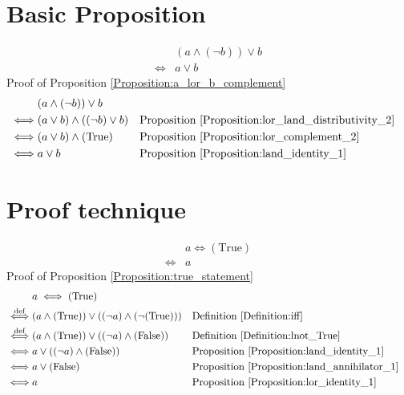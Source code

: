 \section{Basic Proposition}
\begin{prop}
\label{Proposition:a_lor_b_complement}
\begin{align*}
& (a \land (\lnot b)) \lor b \\
\iff & a \lor b
\end{align*}
Proof of Proposition \ref{Proposition:a_lor_b_complement}
\begin{align*}
& (a \land (\lnot b)) \lor b \\
\iff & (a \lor b) \land ((\lnot b) \lor b)
&& \text{Proposition \ref{Proposition:lor_land_distributivity_2}} \\
\iff & (a \lor b) \land (\text{True})
&& \text{Proposition \ref{Proposition:lor_complement_2}} \\
\iff & a \lor b
&& \text{Proposition \ref{Proposition:land_identity_1}} \\
\end{align*}
\end{prop}

\section{Proof technique}
\begin{prop}
\label{Proposition:true_statement}
\begin{align*}
& a \iff (\text{True}) \\
\iff & a
\end{align*}
Proof of Proposition \ref{Proposition:true_statement}
\begin{align*}
& a \iff (\text{True}) \\
\overset{\operatorname{def}}{\iff} & (a \land (\text{True})) \lor ((\lnot a) \land (\lnot (\text{True})))
&& \text{Definition \ref{Definition:iff}} \\
\overset{\operatorname{def}}{\iff} & (a \land (\text{True})) \lor ((\lnot a) \land (\text{False}))
&& \text{Definition \ref{Definition:lnot_True}} \\
\iff & a \lor ((\lnot a) \land (\text{False}))
&& \text{Proposition \ref{Proposition:land_identity_1}} \\
\iff & a \lor (\text{False})
&& \text{Proposition \ref{Proposition:land_annihilator_1}} \\
\iff & a
&& \text{Proposition \ref{Proposition:lor_identity_1}} \\
\end{align*}
\end{prop}

